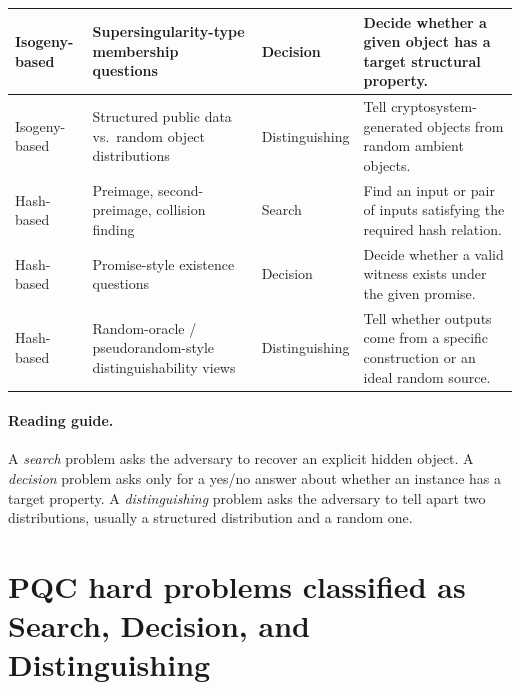 \documentclass[11pt]{article}
\begin{document}
\begin{center}
\begin{tabular}{|p{2.2cm}|p{3.8cm}|p{2cm}|p{6.7cm}|}
			Isogeny-based & Supersingularity-type membership questions & Decision & Decide whether a given object has a target structural property. \\
			\hline
			
			Isogeny-based & Structured public data vs.\ random object distributions & Distinguishing & Tell cryptosystem-generated objects from random ambient objects. \\
			\hline
			
			Hash-based & Preimage, second-preimage, collision finding & Search & Find an input or pair of inputs satisfying the required hash relation. \\
			\hline
			
			Hash-based & Promise-style existence questions & Decision & Decide whether a valid witness exists under the given promise. \\
			\hline
			
			Hash-based & Random-oracle / pseudorandom-style distinguishability views & Distinguishing & Tell whether outputs come from a specific construction or an ideal random source. \\
			\hline
			
		\end{tabular}
	\end{center}
	
	\paragraph{Reading guide.}
	A \emph{search} problem asks the adversary to recover an explicit hidden object.
	A \emph{decision} problem asks only for a yes/no answer about whether an instance has a target property.
	A \emph{distinguishing} problem asks the adversary to tell apart two distributions, usually a structured distribution and a random one.
	
	\newpage
	\section{PQC hard problems classified as Search, Decision, and Distinguishing}
	
\end{document}
